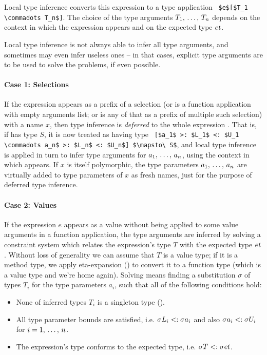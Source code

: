 Local type inference converts this expression to a type application ~\lstinline!$e$[$T_1 \commadots T_n$]!. The choice of the type arguments $T_1 ,\, \ldots ,\, T_n$ depends on the context in which the expression appears and on the expected type $\mbox{\sl et}$. 

Local type inference is not always able to infer all type arguments, and sometimes may even infer useless ones -- in that cases, explicit type arguments are to be used to solve the problems, if even possible. 

\paragraph{Case 1: Selections}
If the expression appears as a prefix of a selection (or is a function application with empty arguments list; or is any of that as a prefix of multiple such selection) with a name $x$, then type inference is {\em deferred} to the whole expression . That is, if  has type $S$, it is now treated as having type ~\lstinline![$a_1$ >: $L_1$ <: $U_1 \commadots a_n$ >: $L_n$ <: $U_n$] $\mapsto\ S$!, and local type inference is applied in turn to infer type arguments for $a_1 ,\, \ldots ,\, a_n$, using the context in which  appears. If $x$ is itself polymorphic, the type parameters $a_1 ,\, \ldots ,\, a_n$ are virtually added to type parameters of $x$ as fresh names, just for the purpose of deferred type inference. 

\paragraph{Case 2: Values}
If the expression $e$ appears as a value without being applied to some value arguments in a function application, the type arguments are inferred by solving a constraint system which relates the expression's type $T$ with the expected type $\mbox{\sl et}$. Without loss of generality we can assume that $T$ is a value type; if it is a method type, we apply eta-expansion () to convert it to a function type (which is a value type and we're home again). Solving means finding a substitution $\sigma$ of types $T_i$ for the type parameters $a_i$, such that all of the following conditions hold:
\begin{itemize}
  \item None of inferred types $T_i$ is a singleton type (). %
  \item All type parameter bounds are satisfied, i.e. $\sigma L_i <: \sigma a_i$ and also $\sigma a_i <: \sigma U_i$ for $i = 1 ,\, \ldots ,\, n$. 
  \item The expression's type conforms to the expected type, i.e. $\sigma T <: \sigma \mbox{\sl et}$. 
\end{itemize}

